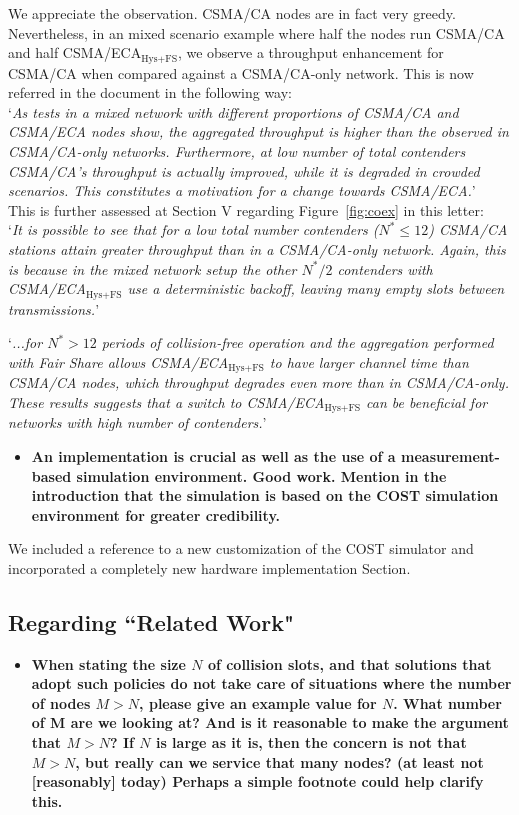 \documentclass[]{article}
\begin{document}
		We appreciate the observation. CSMA/CA nodes are in fact very greedy. Nevertheless, in an mixed scenario example where half the nodes run CSMA/CA and half CSMA/ECA$_{\text{Hys+FS}}$, we observe a throughput enhancement for CSMA/CA when compared against a CSMA/CA-only network. This is now referred in the document in the following way:\\
		
		`\emph{As tests in a mixed network with different proportions of CSMA/CA and CSMA/ECA nodes show, the aggregated throughput is higher than the observed in CSMA/CA-only networks. Furthermore, at low number of total contenders CSMA/CA's throughput is actually improved, while it is degraded in crowded scenarios. This constitutes a motivation for a change towards CSMA/ECA.}'\\
		
		This is further assessed at Section V regarding Figure~\ref{fig:coex} in this letter:\\
		
		`\emph{It is possible to see that for a low total number contenders ($N^{*}\leq 12$) CSMA/CA stations attain greater throughput than in a CSMA/CA-only network. Again, this is because in the mixed network setup the other $N^{*}/2$ contenders with CSMA/ECA$_{\text{Hys+FS}}$ use a deterministic backoff, leaving many empty slots between transmissions.}'
		
		`\emph{...for $N^{*}>12$ periods of collision-free operation and the aggregation performed with Fair Share allows CSMA/ECA$_{\text{Hys+FS}}$ to have larger channel time than CSMA/CA nodes, which throughput degrades even more than in CSMA/CA-only. These results suggests that a switch to CSMA/ECA$_{\text{Hys+FS}}$ can be beneficial for networks with high number of contenders.}'
		
		\begin{itemize}
			\item {\bfseries An implementation is crucial as well as the use of a measurement-based simulation environment. Good work. Mention in the introduction that the simulation is based on the COST simulation environment for greater credibility.}
		\end{itemize}
		
		We included a reference to a new customization of the COST simulator and incorporated a completely new hardware implementation Section.
		
	\subsection{Regarding ``Related Work"}
		\begin{itemize}
			\item {\bfseries When stating the size $N$ of  collision slots, and that solutions that adopt such policies do not take care of situations where the number of nodes $M > N$, please give an example value for $N$. What number of M are we looking at? And is it reasonable to make the argument that $M > N$? If $N$ is large as it is, then the concern is not that $M > N$, but really can we service that many nodes? (at least not [reasonably] today) Perhaps a simple footnote could help clarify this.}
		\end{itemize}
		
\end{document}
